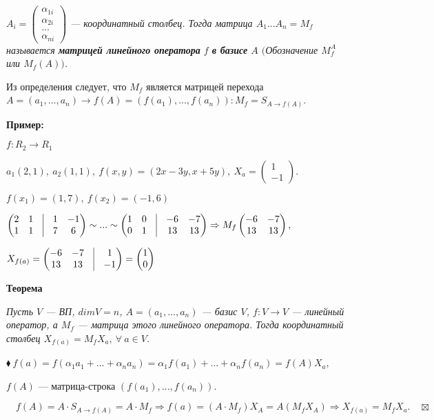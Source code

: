 \documentclass[a4paper, 12pt]{report}
\begin{document}
	\textit{$A_i = \begin{pmatrix} \alpha_{1i} \\ \alpha_{2i} \\ ... \\ \alpha_{ni} \end{pmatrix} $ --- координатный столбец. Тогда матрица $A_1...A_n = M_f$ называется \textbf{матрицей линейного оператора} $f$ \textbf{в базисе} $A$ $($Обозначение $M_f^A$ или $M_f(A))$.}
	\par\bigskip
	Из определения следует, что $M_f$ является матрицей перехода $A = (a_1,...,a_n) \rightarrow f(A) = (f(a_1), ..., f(a_n)) : M_f = S_{A\rightarrow f(A)}$. 
	\par\bigskip
	\textbf{Пример:}
	\par
	$f:R_2\rightarrow R_1$ 
	\par
	$a_1(2,1),\ a_2(1,1),\ f(x,y) = (2x-3y, x+5y),\ X_a = \begin{pmatrix} 1\\ -1 \end{pmatrix}.$ 
	\par
	$f(x_1) = (1,7),\ f(x_2) = (-1, 6)$
	\par
	$\begin{pmatrix} 2 & 1 & \vline & 1 & -1 \\ 1 & 1 & \vline & 7 & 6 \end{pmatrix} \sim ... \sim \begin{pmatrix} 1 & 0 & \vline & -6 & -7 \\ 0 & 1 & \vline & 13 & 13 \end{pmatrix} \Rightarrow M_f \begin{pmatrix} -6 & -7 \\ 13 & 13 \end{pmatrix},$ 
	\par
	$X_{f(a)} = \begin{pmatrix} -6 & -7 & \vline & 1 \\ 13 & 13 & \vline & -1 \end{pmatrix} = \begin{pmatrix} 1 \\ 0 \end{pmatrix}$
	\par\bigskip
	\textbf{Теорема}
	\par
	\textit{Пусть $V$ --- ВП, $dim V = n$, $A=(a_1,...,a_n)$ --- базис $V$, $f:V\rightarrow V$ --- линейный оператор, а $M_f$ --- матрица этого линейного оператора. Тогда координатный столбец $X_{f(a)} = M_f X_a,\ \forall\ a \in V$.}
	\par\bigskip
	$\blacklozenge\ f(a) = f(\alpha_1 a_1 + ... + \alpha_n a_n) = \alpha_1 f(a_1) + ... + \alpha_n f(a_n) = f(A) X_a$, \par{} $f(A)$ --- матрица-строка $(f(a_1),...,f(a_n))$.\par
	$\quad f(A) = A\cdot S_{A\rightarrow f(A)} = A\cdot M_f\Rightarrow f(a) = (A\cdot M_f) X_A = A(M_f X_A) \Rightarrow X_{f(a)} = M_f X_a. \quad \boxtimes$
	
\end{document}
